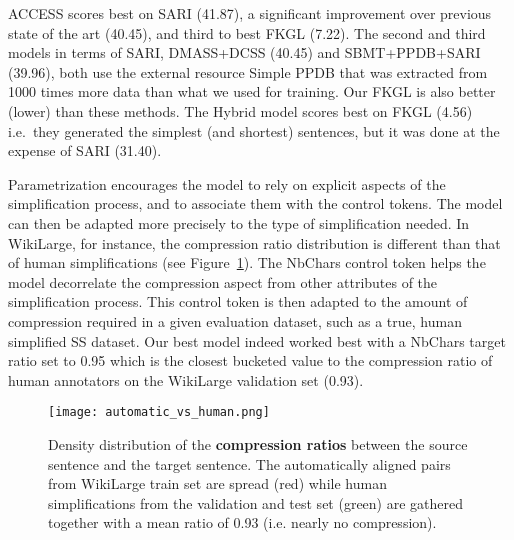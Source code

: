 \documentclass[10pt, a4paper]{article}
\begin{document}
\textsc{ACCESS} scores best on SARI (41.87), a significant improvement over previous state of the art (40.45), and third to best FKGL (7.22).
The second and third models in terms of SARI, DMASS+DCSS (40.45) and SBMT+PPDB+SARI (39.96), both use the external resource Simple PPDB \cite{pavlick2016simple} that was extracted from 1000 times more data than what we used for training. Our FKGL is also better (lower) than these methods.
The Hybrid model scores best on FKGL (4.56) i.e.~they generated the simplest (and shortest) sentences, but it was done at the expense of SARI (31.40).

Parametrization encourages the model to rely on explicit aspects of the simplification process, and to associate them with the control tokens. The model can then be adapted more precisely to the type of simplification needed.
In WikiLarge, for instance, the compression ratio distribution is different than that of human simplifications (see Figure~\ref{automatic_vs_human}).
The NbChars control token helps the model decorrelate the compression aspect from other attributes of the simplification process. This control token is then adapted to the amount of compression required in a given evaluation dataset, such as a true, human simplified SS dataset.
Our best model indeed worked best with a NbChars target ratio set to 0.95 which is the closest bucketed value to the compression ratio of human annotators on the WikiLarge validation set (0.93).


\begin{figure}
    \centering
    \texttt{[image: automatic\_vs\_human.png]}
        \caption{Density distribution of the \textbf{compression ratios} between the source sentence and the target sentence. The automatically aligned pairs from WikiLarge train set are spread (red) while human simplifications from the validation and test set (green) are gathered together with a mean ratio of 0.93 (i.e. nearly no compression). \label{automatic_vs_human}}
\end{figure}
\end{document}
